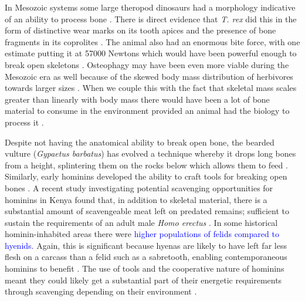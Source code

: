 \documentclass[a4paper,12pt]{article}
\begin{document}
In Mesozoic systems some large theropod dinosaurs had a morphology indicative of an ability to process bone \citep[e.g. the robust skull and dentition of \textit{Tyrannosaurus rex;}][]{hone2010feeding}.
There is direct evidence that \textit{T. rex} did this in the form of distinctive wear marks on its tooth apices \citep{farlow1994wear,schubert2005wear} and the presence of bone fragments in its coprolites \citep{chin1998king}.
The animal also had an enormous bite force, with one estimate putting it at 57000 Newtons \citep{bates2012estimating} which would have been powerful enough to break open skeletons \citep{rayfield2001cranial}.
Osteophagy may have been even more viable during the Mesozoic era as well because of the skewed body mass distribution of herbivores towards larger sizes \citep{10.1371/journal.pone.0051925}.
When we couple this with the fact that skeletal mass scales greater than linearly with body mass \citep{prange1979scaling} there would have been a lot of bone material to consume in the environment provided an animal had the biology to process it \citep{chure1997one}.

Despite not having the anatomical ability to break open bone, the bearded vulture (\textit{Gypaetus barbatus}) has evolved a technique whereby it drops long bones from a height, splintering them on the rocks below which allows them to feed \citep{margalida2008bearded}. 
Similarly, early hominins developed the ability to craft tools for breaking open bones \citep{ARCM:ARCM12084}.
A recent study investigating potential scavenging opportunities for hominins in Kenya found that, in addition to skeletal material, there is a substantial amount of scavengeable meat left on predated remains; sufficient to sustain the requirements of an adult male \textit{Homo erectus} \citep{pobiner2015new}.
In some historical hominin-inhabited areas there were \textcolor{blue}{higher populations of felids compared to hyenids.}
Again, this is significant because hyenas are likely to have left far less flesh on a carcass than a felid such as a sabretooth, enabling contemporaneous hominins to benefit \citep{pobiner2015new}.
The use of tools and the cooperative nature of hominins meant they could likely get a substantial part of their energetic requirements through scavenging depending on their environment \citep{moleon2014humans}.
\end{document}

